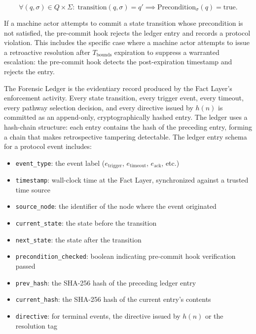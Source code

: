 \begin{equation}
\forall (q, \sigma) \in Q \times \Sigma:\; \text{transition}(q, \sigma) = q' \implies \text{Precondition}_{\sigma}(q) = \text{true}. \tag{Fact-Enforce}
\end{equation}

If a machine actor attempts to commit a state transition whose precondition is not satisfied, the pre-commit hook rejects the ledger entry and records a protocol violation. This includes the specific case where a machine actor attempts to issue a retroactive resolution after $T_{\text{bounds}}$ expiration to suppress a warranted escalation: the pre-commit hook detects the post-expiration timestamp and rejects the entry.

The Forensic Ledger is the evidentiary record produced by the Fact Layer's enforcement activity. Every state transition, every trigger event, every timeout, every pathway selection decision, and every directive issued by $h(n)$ is committed as an append-only, cryptographically hashed entry. The ledger uses a hash-chain structure: each entry contains the hash of the preceding entry, forming a chain that makes retrospective tampering detectable. The ledger entry schema for a protocol event includes:

\begin{itemize}\itemsep=0pt
\item \texttt{event\_type}: the event label ($e_{\text{trigger}}$, $e_{\text{timeout}}$, $e_{\text{ack}}$, etc.)
\item \texttt{timestamp}: wall-clock time at the Fact Layer, synchronized against a trusted time source
\item \texttt{source\_node}: the identifier of the node where the event originated
\item \texttt{current\_state}: the state before the transition
\item \texttt{next\_state}: the state after the transition
\item \texttt{precondition\_checked}: boolean indicating pre-commit hook verification passed
\item \texttt{prev\_hash}: the SHA-256 hash of the preceding ledger entry
\item \texttt{current\_hash}: the SHA-256 hash of the current entry's contents
\item \texttt{directive}: for terminal events, the directive issued by $h(n)$ or the resolution tag
\end{itemize}

